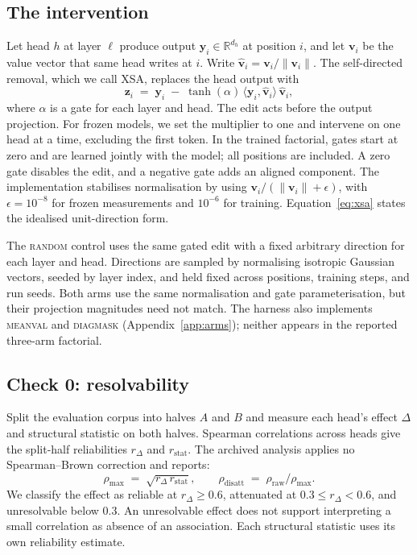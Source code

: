 \documentclass{article} %
\newcommand{\vhat}{\hat{\mathbf{v}}}
\newcommand{\yv}{\mathbf{y}}
\newcommand{\zv}{\mathbf{z}}
\begin{document}
\subsection{The intervention}

Let head $h$ at layer $\ell$ produce output $\yv_i \in \mathbb{R}^{d_h}$ at
position $i$, and let $\mathbf{v}_i$ be the value vector that same head writes
at $i$. Write $\vhat_i = \mathbf{v}_i / \lVert \mathbf{v}_i \rVert$. The
self-directed removal, which we call XSA, replaces the head output with
%
\begin{equation}
\zv_i \;=\; \yv_i \;-\; \tanh(\alpha)\,\langle \yv_i, \vhat_i\rangle\,\vhat_i ,
\label{eq:xsa}
\end{equation}
%
where $\alpha$ is a gate for each layer and head. The edit acts before the
output projection. For frozen models, we set the multiplier to one and
intervene on one head at a time, excluding the first token. In the trained
factorial, gates start at zero and are learned jointly with the model; all
positions are included. A zero gate disables the edit, and a negative gate
adds an aligned component. The implementation stabilises normalisation by
using $\mathbf{v}_i/(\lVert\mathbf{v}_i\rVert+\epsilon)$, with
$\epsilon=10^{-8}$ for frozen measurements and $10^{-6}$ for training.
Equation~\ref{eq:xsa} states the idealised unit-direction form.

The \textsc{random} control uses the same gated edit with a fixed arbitrary
direction for each layer and head. Directions are sampled by normalising
isotropic Gaussian vectors, seeded by layer index, and held fixed across
positions, training steps, and run seeds. Both arms use the same normalisation
and gate parameterisation, but their projection magnitudes need not match.
The harness also implements \textsc{meanval} and \textsc{diagmask}
(Appendix~\ref{app:arms}); neither appears in the reported three-arm factorial.

\subsection{Check 0: resolvability}

Split the evaluation corpus into halves $A$ and $B$ and measure each head's
effect $\Delta$ and structural statistic on both halves. Spearman
correlations across heads give the split-half reliabilities $r_\Delta$ and
$r_{\text{stat}}$. The archived analysis applies no Spearman--Brown
correction and reports:
%
\begin{equation}
\rho_{\max} \;=\; \sqrt{r_\Delta \, r_{\text{stat}}},
\qquad
\rho_{\text{disatt}} \;=\; \rho_{\text{raw}} / \rho_{\max}.
\label{eq:ceiling}
\end{equation}
%
We classify the effect as reliable at $r_\Delta \ge 0.6$, attenuated at
$0.3 \le r_\Delta < 0.6$, and unresolvable below $0.3$. An unresolvable
effect does not support interpreting a small correlation as absence of an
association. Each structural statistic uses its own reliability estimate.
\end{document}
